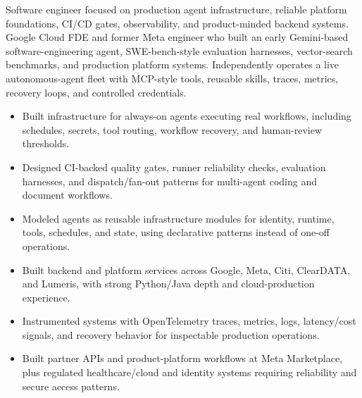 


Software engineer focused on production agent infrastructure, reliable platform foundations, CI/CD gates, observability, and product-minded backend systems. Google Cloud FDE and former Meta engineer who built an early Gemini-based software-engineering agent, SWE-bench-style evaluation harnesses, vector-search benchmarks, and production platform systems. Independently operates a live autonomous-agent fleet with MCP-style tools, reusable skills, traces, metrics, recovery loops, and controlled credentials.
\begin{itemize}
  \item Built infrastructure for always-on agents executing real workflows, including schedules, secrets, tool routing, workflow recovery, and human-review thresholds.
  \item Designed CI-backed quality gates, runner reliability checks, evaluation harnesses, and dispatch/fan-out patterns for multi-agent coding and document workflows.
  \item Modeled agents as reusable infrastructure modules for identity, runtime, tools, schedules, and state, using declarative patterns instead of one-off operations.
\end{itemize}
\begin{itemize}
  \item Built backend and platform services across Google, Meta, Citi, ClearDATA, and Lumeris, with strong Python/Java depth and cloud-production experience.
  \item Instrumented systems with OpenTelemetry traces, metrics, logs, latency/cost signals, and recovery behavior for inspectable production operations.
  \item Built partner APIs and product-platform workflows at Meta Marketplace, plus regulated healthcare/cloud and identity systems requiring reliability and secure access patterns.
\end{itemize}




